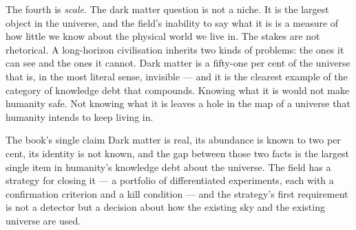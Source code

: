 The fourth is \emph{scale}. The dark matter question is not a niche. It is
the largest object in the universe, and the field's inability to say what it
is is a measure of how little we know about the physical world we live in.
The stakes are not rhetorical. A long-horizon civilisation inherits two
kinds of problems: the ones it can see and the ones it cannot. Dark matter
is a fifty-one per cent of the universe that is, in the most literal sense,
invisible --- and it is the clearest example of the category of knowledge
debt that compounds. Knowing what it is would not make humanity safe. Not
knowing what it is leaves a hole in the map of a universe that humanity
intends to keep living in.

\begin{takeaway}{The book's single claim}
Dark matter is real, its abundance is known to two per cent, its identity is
not known, and the gap between those two facts is the largest single item in
humanity's knowledge debt about the universe. The field has a strategy for
closing it --- a portfolio of differentiated experiments, each with a
confirmation criterion and a kill condition --- and the strategy's first
requirement is not a detector but a decision about how the existing sky and
the existing universe are used.\end{takeaway}
